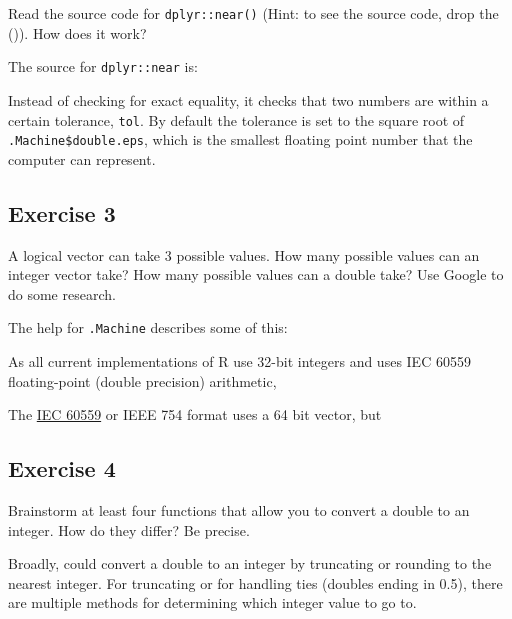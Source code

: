 \documentclass[]{book}
\newenvironment{Shaded}{\begin{snugshade}}{\end{snugshade}}
\newcommand{\CommentTok}[1]{\textcolor[rgb]{0.56,0.35,0.01}{\textit{#1}}}
\newcommand{\NormalTok}[1]{#1}
\newcommand{\OperatorTok}[1]{\textcolor[rgb]{0.81,0.36,0.00}{\textbf{#1}}}
\theoremstyle{definition}
\theoremstyle{definition}
\theoremstyle{definition}
\theoremstyle{remark}
\begin{document}
Read the source code for \texttt{dplyr::near()} (Hint: to see the source
code, drop the ()). How does it work?

The source for \texttt{dplyr::near} is:

\begin{Shaded}
\end{Shaded}

Instead of checking for exact equality, it checks that two numbers are
within a certain tolerance, \texttt{tol}. By default the tolerance is
set to the square root of \texttt{.Machine\$double.eps}, which is the
smallest floating point number that the computer can represent.

\hypertarget{exercise-3-35}{%
\subsection{Exercise 3}\label{exercise-3-35}}

A logical vector can take 3 possible values. How many possible values
can an integer vector take? How many possible values can a double take?
Use Google to do some research.

The help for \texttt{.Machine} describes some of this:

As all current implementations of R use 32-bit integers and uses IEC
60559 floating-point (double precision) arithmetic,

The
\href{https://en.wikipedia.org/wiki/Double-precision_floating-point_format}{IEC
60559} or IEEE 754 format uses a 64 bit vector, but

\hypertarget{exercise-4-28}{%
\subsection{Exercise 4}\label{exercise-4-28}}

Brainstorm at least four functions that allow you to convert a double to
an integer. How do they differ? Be precise.

Broadly, could convert a double to an integer by truncating or rounding
to the nearest integer. For truncating or for handling ties (doubles
ending in 0.5), there are multiple methods for determining which integer
value to go to.
\end{document}
